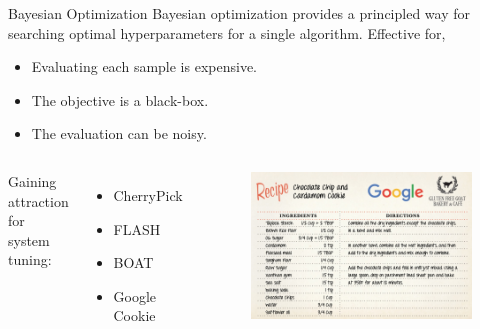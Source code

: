 \begin{frame}{Bayesian Optimization}
  Bayesian optimization provides a principled way for searching optimal
  hyperparameters for a single algorithm. Effective for,
  
  \begin{itemize}
    \item Evaluating each sample is expensive.
    \item The objective is a black-box.
    \item The evaluation can be noisy.
  \end{itemize}

  \begin{columns}
    \footnotesize
    Gaining attraction for system tuning:

    \begin{itemize}
    \item CherryPick~\cite{alipourfard2017cherrypick}
    \item FLASH~\cite{zhang2016flash}
    \item BOAT~\cite{dalibard2017boat}
    \item Google Cookie\cite{solnik2017bayesian}
    \end{itemize}
    \begin{figure}
      \includegraphics[width=\linewidth]{figures/google-cookie.jpg}
    \end{figure}
  \end{columns}
  
\end{frame}

